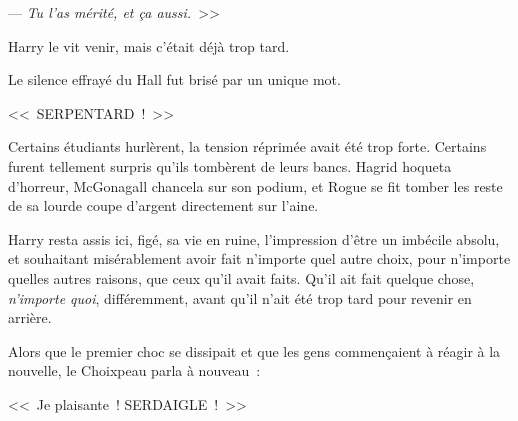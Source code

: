 --- \emph{Tu l'as mérité, et ça aussi.}~>>

Harry le vit venir, mais c'était déjà trop tard.

Le silence effrayé du Hall fut brisé par un unique mot.

<<~SERPENTARD~!~>>

Certains étudiants hurlèrent, la tension réprimée avait été trop forte. Certains furent tellement surpris qu'ils tombèrent de leurs bancs. Hagrid hoqueta d'horreur, McGonagall chancela sur son podium, et Rogue se fit tomber les reste de sa lourde coupe d'argent directement sur l'aine.

Harry resta assis ici, figé, sa vie en ruine, l'impression d'être un imbécile absolu, et souhaitant misérablement avoir fait n'importe quel autre choix, pour n'importe quelles autres raisons, que ceux qu'il avait faits. Qu'il ait fait quelque chose, \emph{n'importe quoi}, différemment, avant qu'il n'ait été trop tard pour revenir en arrière.

Alors que le premier choc se dissipait et que les gens commençaient à réagir à la nouvelle, le Choixpeau parla à nouveau~:

<<~Je plaisante~! SERDAIGLE~!~>> 


